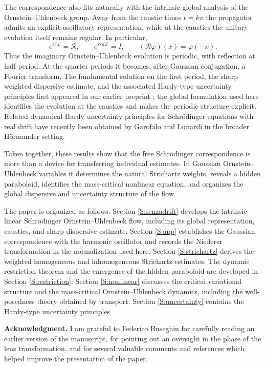 \documentclass[11pt,a4paper]{amsart}
\def \vf{\varphi}
\numberwithin{equation}{section}
\numberwithin{equation}{section}
\begin{document}
The correspondence also fits naturally with the intrinsic global
analysis of the Ornstein--Uhlenbeck group.  Away from the caustic
times $t=k\pi$ the propagator admits an explicit oscillatory
representation, while at the caustics the unitary evolution itself
remains regular.  In particular,
\[
e^{i\pi\mathscr L}=\mathcal R,
\qquad
e^{i2\pi\mathscr L}=I,
\qquad
(\mathcal R\vf)(x)=\vf(-x).
\]
Thus the imaginary Ornstein--Uhlenbeck evolution is periodic, with
reflection at half-period.  At the quarter periods it becomes,
after Gaussian conjugation, a Fourier transform.  The fundamental
solution on the first period, the sharp weighted dispersive estimate,
and the associated Hardy-type uncertainty principles first appeared
in our earlier preprint \cite{GarOUpre}; the global formulation used
here identifies the evolution at the caustics and makes the periodic
structure explicit.  Related dynamical Hardy uncertainty principles
for Schr\"odinger equations with real drift have recently been
obtained by Garofalo and Lunardi \cite{GarLun} in the broader
H\"ormander setting.

Taken together, these results show that the free Schr\"odinger
correspondence is more than a device for transferring individual
estimates.  In Gaussian Ornstein--Uhlenbeck variables it determines
the natural Strichartz weights, reveals a hidden paraboloid,
identifies the mass-critical nonlinear equation, and organizes the
global dispersive and uncertainty structure of the flow.

The paper is organized as follows.  Section \ref{S:senzadrift}
develops the intrinsic linear Schr\"odinger Ornstein--Uhlenbeck flow,
including its global representation, caustics, and sharp dispersive
estimate.  Section \ref{S:app} establishes the Gaussian
correspondence with the harmonic oscillator and records the Niederer
transformation in the normalization used here.  Section
\ref{S:strichartz} derives the weighted homogeneous and
inhomogeneous Strichartz estimates.  The dynamic restriction theorem
and the emergence of the hidden paraboloid are developed in Section
\ref{S:restriction}.  Section \ref{S:nonlinear} discusses the
critical variational structure and the mass-critical
Ornstein--Uhlenbeck dynamics, including the well-posedness theory
obtained by transport.  Section \ref{S:uncertainty} contains the
Hardy-type uncertainty principles.

\medskip

\noindent\textbf{Acknowledgment.}
I am grateful to Federico Buseghin for carefully reading an earlier
version of the manuscript, for pointing out an oversight in the phase
of the lens transformation, and for several valuable comments and
references which helped improve the presentation of the paper.
\end{document}
